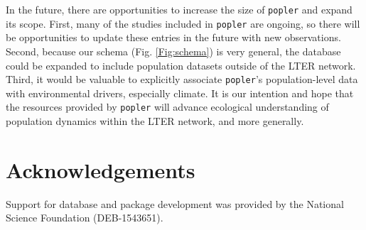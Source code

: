 \documentclass{article}\usepackage[]{graphicx}\usepackage[]{color}
\newcommand{\tom}[1]{{\textit{\color{red}{[#1]}}}}
\begin{document}
In the future, there are opportunities to increase the size of \texttt{popler} and expand its scope. First, many of the studies included in \texttt{popler} are ongoing, so there will be opportunities to update these entries in the future with new observations. Second, because our schema (Fig. \ref{Fig:schema}) is very general, the database could be expanded to include population datasets outside of the LTER network. Third, it would be valuable to explicitly associate \texttt{popler}'s population-level data with environmental drivers, especially climate. It is our intention and hope that the resources provided by \texttt{popler} will advance ecological understanding of population dynamics within the LTER network, and more generally.

\section*{Acknowledgements}
Support for database and package development was provided by the National Science Foundation (DEB-1543651). \tom{We should probably acknowledge NSF support of LTER, as well as coauthor-specific acknowledgements. }


\end{document}
